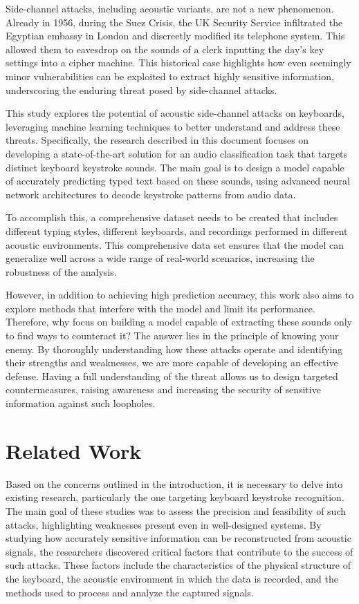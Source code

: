\documentclass[a4paper,11pt,twoside]{report}
\theoremstyle{definition}
\begin{document}
Side-channel attacks, including acoustic variants, are not a new phenomenon. Already in 1956, during the Suez Crisis, the UK Security Service infiltrated the Egyptian embassy in London and discreetly modified its telephone system. This allowed them to eavesdrop on the sounds of a clerk inputting the day’s key settings into a cipher machine. This historical case highlights how even seemingly minor vulnerabilities can be exploited to extract highly sensitive information, underscoring the enduring threat posed by side-channel attacks.

This study explores the potential of acoustic side-channel attacks on keyboards, leveraging machine learning techniques to better understand and address these threats. Specifically, the research described in this document focuses on developing a state-of-the-art solution for an audio classification task that targets distinct keyboard keystroke sounds. The main goal is to design a model capable of accurately predicting typed text based on these sounds, using advanced neural network architectures to decode keystroke patterns from audio data.

To accomplish this, a comprehensive dataset needs to be created that includes different typing styles, different keyboards, and recordings performed in different acoustic environments. This comprehensive data set ensures that the model can generalize well across a wide range of real-world scenarios, increasing the robustness of the analysis.

However, in addition to achieving high prediction accuracy, this work also aims to explore methods that interfere with the model and limit its performance. Therefore, why focus on building a model capable of extracting these sounds only to find ways to counteract it? The answer lies in the principle of knowing your enemy. By thoroughly understanding how these attacks operate and identifying their strengths and weaknesses, we are more capable of developing an effective defense. Having a full understanding of the threat allows us to design targeted countermeasures, raising awareness and increasing the security of sensitive information against such loopholes.




\chapter{Related Work}

Based on the concerns outlined in the introduction, it is necessary to delve into existing research, particularly the one targeting keyboard keystroke recognition. The main goal of these studies was to assess the precision and feasibility of such attacks, highlighting weaknesses present even in well-designed systems. By studying how accurately sensitive information can be reconstructed from acoustic signals, the researchers discovered critical factors that contribute to the success of such attacks. These factors include the characteristics of the physical structure of the keyboard, the acoustic environment in which the data is recorded, and the methods used to process and analyze the captured signals.
\end{document}
